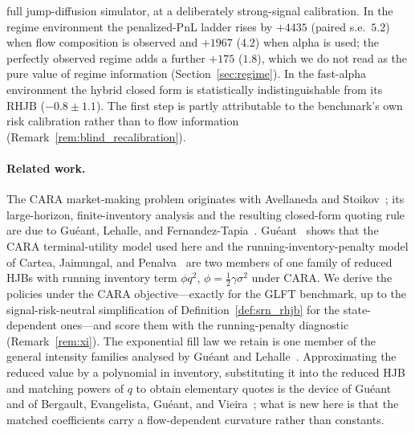 \documentclass[11pt,a4paper]{article}
\theoremstyle{plain}
\theoremstyle{definition}
\begin{document}
\begin{itemize}[leftmargin=1.2em,itemsep=1pt,topsep=2pt]
  full jump-diffusion simulator, at a deliberately strong-signal calibration.
  In the regime environment the penalized-PnL ladder rises by \(+4435\)
  (paired s.e.\ \(5.2\)) when flow composition is observed and \(+1967\)
  (\(4.2\)) when alpha is used; the perfectly observed regime adds a further
  \(+175\) (\(1.8\)), which we do not read as the pure value of regime
  information (Section~\ref{sec:regime}).  In the fast-alpha environment the
  hybrid closed form is statistically indistinguishable from its RHJB
  (\(-0.8\pm1.1\)).  The first step is partly attributable to the benchmark's
  own risk calibration rather than to flow information
  (Remark~\ref{rem:blind_recalibration}).
\end{itemize}

\paragraph{Related work.}
The CARA market-making problem originates with Avellaneda and
Stoikov~\cite{AvellanedaStoikov2008}; its large-horizon, finite-inventory
analysis and the resulting closed-form quoting rule are due to Gu\'eant,
Lehalle, and Fernandez-Tapia~\cite{GLFT2013}.  Gu\'eant~\cite{Gueant2017}
shows that the CARA terminal-utility model used here and the
running-inventory-penalty model of Cartea, Jaimungal, and
Penalva~\cite{CarteaJaimungalPenalva2015} are two members of one family of
reduced HJBs with running inventory term \(\phi q^2\),
\(\phi=\tfrac12\gamma\sigma^2\) under CARA.  We derive the policies under the
CARA objective---exactly for the GLFT benchmark, up to the signal-risk-neutral
simplification of Definition~\ref{def:srn_rhjb} for the state-dependent
ones---and score them with the running-penalty diagnostic
(Remark~\ref{rem:xi}).  The exponential fill law we retain is one member of
the general intensity families analysed by Gu\'eant and
Lehalle~\cite{GueantLehalle2015}.  Approximating the reduced value by a
polynomial in inventory, substituting it into the reduced HJB and matching
powers of \(q\) to obtain elementary quotes is the device of
Gu\'eant~\cite{Gueant2017} and of Bergault, Evangelista, Gu\'eant, and
Vieira~\cite{BergaultEvangelistaGueantVieira2021}; what is new here is that the
matched coefficients carry a flow-dependent curvature rather than constants.
\end{document}
